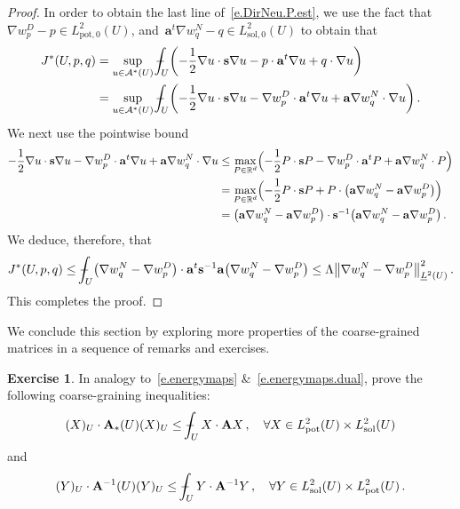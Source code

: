 \documentclass[11pt,twoside]{article} %
\numberwithin{equation}{section}
\theoremstyle{definition}
\newtheorem{exercise}[theorem]{Exercise}
\newcommand*{\Rd}{\ensuremath{\mathbb{R}^d}}
\newcommand{\s}{\mathbf{s}}
\newcommand{\pot}{\mathrm{pot}}
\newcommand{\sol}{\mathrm{sol}}
\renewcommand{\a}{\mathbf{a}}
\def\Xint#1{\mathchoice
{\XXint\displaystyle\textstyle{#1}}%
{\XXint\textstyle\scriptstyle{#1}}%
{\XXint\scriptstyle\scriptscriptstyle{#1}}%
{\XXint\scriptscriptstyle\scriptscriptstyle{#1}}%
\!\int}
\def\XXint#1#2#3{{\setbox0=\hbox{$#1{#2#3}{\int}$}
\vcenter{\hbox{$#2#3$}}\kern-.5\wd0}}
\def\fint{\Xint-}
\newcommand{\A}{\mathcal{A}}
\newcommand{\bfA}{\mathbf{A}}
\begin{document}
\begin{proof}
In order to obtain the last line of~\eqref{e.DirNeu.P.est}, we use the fact that~$\nabla w_p^D - p \in L^2_{\pot,0}(U)$, and~$\a^t\nabla w_q^N-q \in L^2_{\sol,0}(U)$ to obtain that 
\begin{align*}
J^*(U,p,q) 
& 
=
\sup_{u \in \A^*(U)} 
\fint_U 
\biggl( 
-\frac12 \nabla u\cdot \s \nabla u 
- p\cdot \a^t \nabla u
+ q \cdot \nabla u 
\biggr) 
\notag \\ & 
=
\sup_{u \in \A^*(U)} 
\fint_U 
\biggl( 
-\frac12 \nabla u\cdot \s \nabla u 
- \nabla w_p^D \cdot \a^t \nabla u
+ \a \nabla w_{q}^N \cdot \nabla u 
\biggr) 
\,.
\end{align*}
We next use the pointwise bound 
\begin{align*}
-\frac12 \nabla u\cdot \s \nabla u 
- \nabla w_p^D \cdot \a^t \nabla u
+ \a \nabla w_{q}^N \cdot \nabla u 
&
\leq 
\max_{P \in\Rd} 
\Bigl( 
-\frac12 P\cdot \s P 
- \nabla w_p^D \cdot \a^t P
+ \a \nabla w_{q}^N \cdot P 
\Bigr) 
\notag \\ & 
=
\max_{P \in\Rd} 
\Bigl( 
-\frac12 P\cdot \s P 
+ P \cdot \bigl( \a \nabla w_{q}^N  - \a \nabla w_p^D  \bigr)
\Bigr) 
\notag \\ & 
=
\bigl( \a \nabla w_{q}^N  - \a \nabla w_p^D  \bigr) \cdot \s^{-1}  \bigl( \a \nabla w_{q}^N  - \a \nabla w_p^D  \bigr)
 \,.
\end{align*}
We deduce, therefore, that 
\begin{equation*}
J^*(U,p,q) 
\leq 
\fint_U 
\bigl( \nabla w_{q}^N  - \nabla w_p^D  \bigr) \cdot \a^t\s^{-1}\a  \bigl( \nabla w_{q}^N  - \nabla w_p^D  \bigr)
\leq 
\Lambda
\bigl\| \nabla w_{q}^N  - \nabla w_p^D \bigr\|_{\underline{L}^2(U)}^2\,.
\end{equation*}
This completes the proof. 
\end{proof}

We conclude this section by exploring more properties of the coarse-grained matrices in a sequence of remarks and exercises. 

\begin{exercise}
In analogy to~\eqref{e.energymaps} \&~\eqref{e.energymaps.dual}, prove the following coarse-graining inequalities: 
\begin{equation}
\label{e.energymaps.nonsymm.bfA}
(X)_U \cdot \bfA_*(U) (X)_U \leq 
\fint_{U} X\cdot \bfA X \,, \quad \forall X \in L^2_{\pot}(U) \times L^2_{\sol}(U)
\end{equation}
and
\begin{equation}
\label{e.energymaps.dual.nonsymm.bfA}
(Y)_U \cdot \bfA^{-1} (U) (Y)_U \leq 
\fint_{U} Y \cdot \bfA^{-1} Y \,, \quad 
\forall Y \in L^2_{\sol}(U) \times L^2_{\pot}(U)\,.
\end{equation}
\end{exercise}
\end{document}

